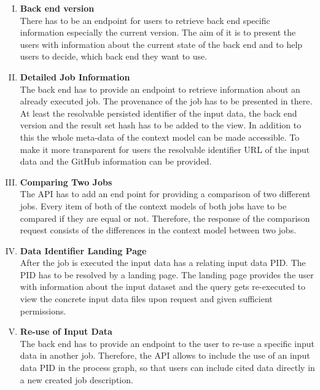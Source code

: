 \documentclass[draft,final]{vutinfth} %
\begin{document}
\begin{enumerate}[I.]
\item \textbf{Back end version} \\
	There has to be an endpoint for users to retrieve back end specific information especially the current version. The aim of it is to present the users with information about the current state of the back end and to help users to decide, which back end they want to use. 

\item \textbf{Detailed Job Information} \\
	The back end has to provide an endpoint to retrieve information about an already executed job. The provenance of the job has to be presented in there. At least the resolvable persisted identifier of the input data, the back end version and the result set hash has to be added to the view. In addition to this the whole meta-data of the context model can be made accessible. To make it more transparent for users the resolvable identifier URL of the input data and the GitHub information can be provided.   

\item \textbf{Comparing Two Jobs} \\
	The API has to add an end point for providing a comparison of two different jobs.  Every item of both of the context models of both jobs have to be compared if they are equal or not. Therefore, the response of the comparison request consists of the differences in the context model between two jobs.

\item \textbf{Data Identifier Landing Page} \\
	After the job is executed the input data has a relating input data PID. The PID has to be resolved by a landing page. The landing page provides the user with information about the input dataset and the query gets re-executed to view the concrete input data files upon request and given sufficient permissions.
    
\item \textbf{Re-use of Input Data} \\
	The back end has to provide an endpoint to the user to re-use a specific input data in another job. Therefore, the API allows to include the use of an input data PID in the process graph, so that users can include cited data directly in a new created job description.  
\end{enumerate}
\end{document}
